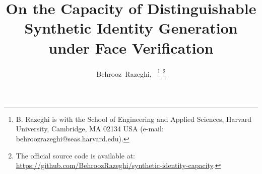 \documentclass[journal]{IEEEtran}
\begin{document}
\begin{bibunit}

\title{On the Capacity of Distinguishable Synthetic Identity Generation under Face Verification}

\author{Behrooz~Razeghi\textsuperscript{},~%
\thanks{B. Razeghi is with the School of Engineering and Applied Sciences, Harvard University, Cambridge,
MA 02134 USA (e-mail: behroozrazeghi@seas.harvard.edu).}%
\thanks{The official source code is available at: \url{https://github.com/BehroozRazeghi/synthetic-identity-capacity}.}%
%
}


% 




\maketitle


\end{bibunit}
\end{document}
